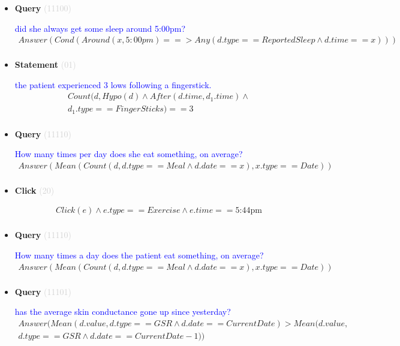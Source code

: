 \documentclass[11pt]{article}
\newcommand{\key}[1]{\textcolor{lightgray}{#1}}
\newcounter{CQuery}
\newcounter{CStatement}
\newcounter{CClick}
\begin{document}
\begin{itemize}
\item
\textbf{Query\theCQuery} \key{(11100)} \addtocounter{CQuery}{1}
\textcolor{blue}{ did she always get some sleep around 5:00pm? }
\begin{multline*}
Answer(Cond(Around(x, 5:00pm) ==> Any(d.type==ReportedSleep \wedge d.time==x))) \\ 
\end{multline*}


\item
\textbf{Statement\theCStatement} \key{(01)} \addtocounter{CStatement}{1}
\textcolor{blue}{ the patient experienced 3 lows following a fingerstick. }
\begin{multline*}
Count(d, Hypo(d) \wedge After(d.time, d_1.time) \wedge \\ 
d_1.type==FingerSticks)==3 \\ 
\end{multline*}


\item
\textbf{Query\theCQuery} \key{(11110)} \addtocounter{CQuery}{1}
\textcolor{blue}{ How many times per day does she eat something, on average? }
\begin{multline*}
Answer(Mean(Count(d, d.type==Meal \wedge d.date==x), x.type==Date)) \\ 
\end{multline*}


\item
\textbf{Click\theCClick} \key{(20)} \addtocounter{CClick}{1}
\textcolor{blue}{  }
\begin{multline*}
Click(e) \wedge e.type==Exercise \wedge e.time==\mbox{5:44pm} \\ 
\end{multline*}


\item
\textbf{Query\theCQuery} \key{(11110)} \addtocounter{CQuery}{1}
\textcolor{blue}{ How many times a day does the patient eat something, on average? }
\begin{multline*}
Answer(Mean(Count(d, d.type==Meal \wedge d.date==x), x.type==Date)) \\ 
\end{multline*}


\item
\textbf{Query\theCQuery} \key{(11101)} \addtocounter{CQuery}{1}
\textcolor{blue}{ has the average skin conductance gone up since yesterday? }
\begin{multline*}
Answer(Mean(d.value, d.type==GSR \wedge d.date==CurrentDate) > Mean(d.value, \\ 
d.type==GSR \wedge d.date==CurrentDate-1)) \\ 
\end{multline*}



\end{itemize}
\end{document}
